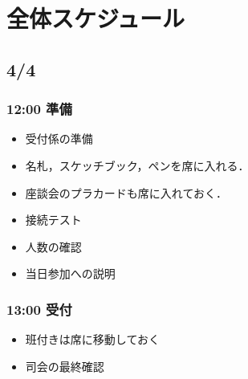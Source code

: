 \chapter{全体スケジュール}

\section{4/4}

\subsection*{12:00 準備}
\begin{itemize}
  \item 受付係の準備
  \item 名札，スケッチブック，ペンを席に入れる．
  \item 座談会のプラカードも席に入れておく．
  \item 接続テスト
  \item 人数の確認
  \item 当日参加への説明
\end{itemize}

\subsection*{13:00 受付}
\begin{itemize}
  \item 班付きは席に移動しておく
  \item 司会の最終確認
\end{itemize}

